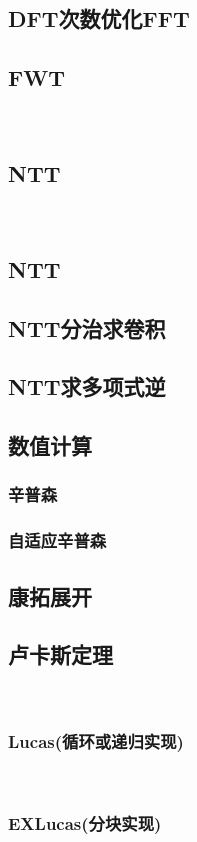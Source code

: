 \documentclass[twocolumn,a4]{article}
\newcommand{\addcpp}[1]{}
\begin{document}
		\subsection{DFT次数优化FFT}
			\addcpp{math/FFT_2}
	\subsection{FWT}
​	 \subsection{NTT}
​		 \subsection{NTT}
			\addcpp{math/NTT}
		\subsection{NTT分治求卷积}
			\addcpp{math/NTT_cdq}
		\subsection{NTT求多项式逆}
			\addcpp{math/NTT_inv}
	\subsection{数值计算}
		\subsubsection{辛普森}
		\subsubsection{自适应辛普森}
			\addcpp{math/adaptive_simpson}
	\subsection{康拓展开}
		\addcpp{math/contor}
	\subsection{卢卡斯定理}
		​\subsubsection{Lucas(循环或递归实现)}
		​	\addcpp{math/Lucas}
		​\subsubsection{EXLucas(分块实现)}
		​	\addcpp{math/EXLucas}
\end{document}
